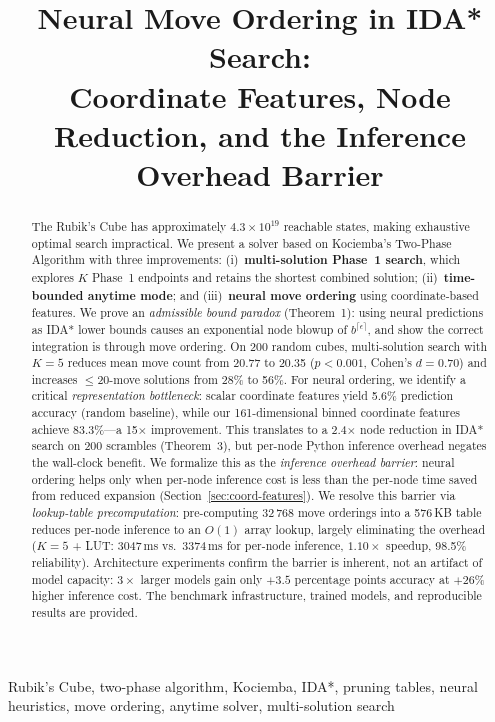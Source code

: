 \documentclass[conference]{IEEEtran}
\title{Neural Move Ordering in IDA* Search:\\ Coordinate Features, Node Reduction, and the Inference Overhead Barrier}
\author{\IEEEauthorblockN{Akash Chakraborty}
\IEEEauthorblockA{Department Of Computer Science And Engineering / Sister Nivedita University\\
akashchakraborty694@gmail.com}}
\begin{document}
\maketitle

\begin{abstract}
The Rubik's Cube has approximately $4.3 \times 10^{19}$ reachable states, making exhaustive optimal search impractical. We present a solver based on Kociemba's Two-Phase Algorithm with three improvements: (i)~\textbf{multi-solution Phase~1 search}, which explores $K$ Phase~1 endpoints and retains the shortest combined solution; (ii)~\textbf{time-bounded anytime mode}; and (iii)~\textbf{neural move ordering} using coordinate-based features. We prove an \emph{admissible bound paradox} (Theorem~1): using neural predictions as IDA* lower bounds causes an exponential node blowup of $b^{\lceil\epsilon\rceil}$, and show the correct integration is through move ordering. On 200 random cubes, multi-solution search with $K{=}5$ reduces mean move count from 20.77 to 20.35 ($p < 0.001$, Cohen's $d = 0.70$) and increases $\leq$20-move solutions from 28\% to 56\%. For neural ordering, we identify a critical \emph{representation bottleneck}: scalar coordinate features yield 5.6\% prediction accuracy (random baseline), while our 161-dimensional binned coordinate features achieve 83.3\%---a 15$\times$ improvement. This translates to a 2.4$\times$ node reduction in IDA* search on 200 scrambles (Theorem~3), but per-node Python inference overhead negates the wall-clock benefit. We formalize this as the \emph{inference overhead barrier}: neural ordering helps only when per-node inference cost is less than the per-node time saved from reduced expansion (Section~\ref{sec:coord-features}). We resolve this barrier via \emph{lookup-table precomputation}: pre-computing 32\,768 move orderings into a 576\,KB table reduces per-node inference to an $O(1)$ array lookup, largely eliminating the overhead ($K{=}5$ + LUT: 3047\,ms vs.\ 3374\,ms for per-node inference, $1.10{\times}$ speedup, 98.5\% reliability). Architecture experiments confirm the barrier is inherent, not an artifact of model capacity: $3{\times}$ larger models gain only $+3.5$ percentage points accuracy at $+26$\% higher inference cost. The benchmark infrastructure, trained models, and reproducible results are provided.
\end{abstract}

\begin{IEEEkeywords}
Rubik's Cube, two-phase algorithm, Kociemba, IDA*, pruning tables, neural heuristics, move ordering, anytime solver, multi-solution search
\end{IEEEkeywords}
\end{document}
